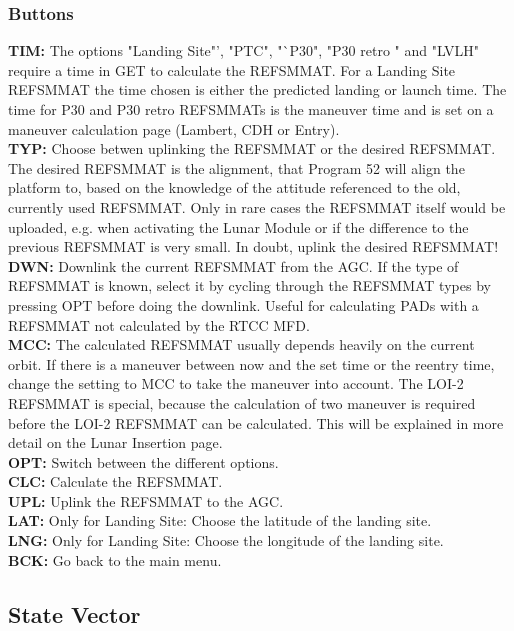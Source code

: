 \documentclass[11pt]{article} %
\begin{document}
\subsubsection{Buttons}
	\textbf{TIM:} The options "Landing Site"', "PTC", "`P30", "P30 retro " and "LVLH" require a time in GET to calculate the REFSMMAT. For a Landing Site REFSMMAT the time chosen is either the predicted landing or launch time. The time for P30 and P30 retro REFSMMATs is the maneuver time and is set on a maneuver calculation page (Lambert, CDH or Entry).\\
	\textbf{TYP:} Choose betwen uplinking the REFSMMAT or the desired REFSMMAT. The desired REFSMMAT is the alignment, that Program 52 will align the platform to, based on the knowledge of the attitude referenced to the old, currently used REFSMMAT. Only in rare cases the REFSMMAT itself would be uploaded, e.g. when activating the Lunar Module or if the difference to the previous REFSMMAT is very small. In doubt, uplink the desired REFSMMAT!\\
	\textbf{DWN:} Downlink the current REFSMMAT from the AGC. If the type of REFSMMAT is known, select it by cycling through the REFSMMAT types by pressing OPT before doing the downlink. Useful for calculating PADs with a REFSMMAT not calculated by the RTCC MFD.\\
	\textbf{MCC:} The calculated REFSMMAT usually depends heavily on the current orbit. If there is a maneuver between now and the set time or the reentry time, change the setting to MCC to take the maneuver into account. The LOI-2 REFSMMAT is special, because the calculation of two maneuver is required before the LOI-2 REFSMMAT can be calculated. This will be explained in more detail on the Lunar Insertion page.\\
	\textbf{OPT:} Switch between the different options.\\
	\textbf{CLC:} Calculate the REFSMMAT.\\
	\textbf{UPL:} Uplink the REFSMMAT to the AGC.\\
	\textbf{LAT:} Only for Landing Site: Choose the latitude of the landing site.\\
	\textbf{LNG:} Only for Landing Site: Choose the longitude of the landing site.\\
	\textbf{BCK:} Go back to the main menu.\\

\subsection{State Vector}
\end{document}
